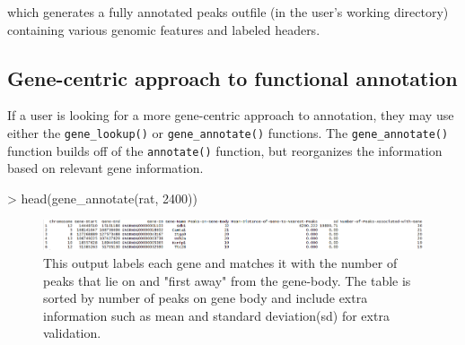 \documentclass[12pt]{article}
\begin{document}
which generates a fully annotated peaks outfile (in the user's working directory) containing various genomic features and labeled headers.

\subsection*{Gene-centric approach to functional annotation}

If a user is looking for a more gene-centric approach to an\-notation, they may use either the \texttt{gene\_lookup()}
or \texttt{gene\_annotate()} functions. The \texttt{gene\_annotate()} function builds off of the \texttt{annotate()} function, but reorganizes the information based on relevant gene information.

\begin{Schunk}
\begin{Sinput}
> head(gene_annotate(rat, 2400))
\end{Sinput}
\end{Schunk}

\begin{figure}[H]
\centering
\includegraphics{figures/vignette_gene_annotate_2400.PNG}
\caption{This output labels each gene and matches it with the number of peaks that lie on and "first away" from the gene-body. The table is sorted by number of peaks on gene body and include extra information such as mean and standard deviation(sd) for extra validation.}
\end{figure}
\end{document}
